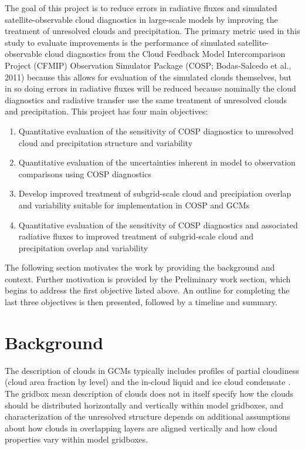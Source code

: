 \documentclass[letter]{article}
\begin{document}
The goal of this project is to reduce errors in radiative fluxes and simulated satellite-observable cloud diagnostics in large-scale models by improving the treatment of unresolved clouds and precipitation. The primary metric used in this study to evaluate improvements is the performance of simulated satellite-observable cloud diagnostics from the Cloud Feedback Model Intercomparison Project (CFMIP) Observation Simulator Package (COSP; Bodas-Salcedo et al., 2011) because this allows for evaluation of the simulated clouds themselves, but in so doing errors in radiative fluxes will be reduced because nominally the cloud diagnostics and radiative transfer use the same treatment of unresolved clouds and precipitation. 
This project has four main objectives:
\begin{enumerate}
    \item Quantitative evaluation of the sensitivity of COSP diagnostics to unresolved cloud and precipitation structure and variability
    \item Quantitative evaluation of the uncertainties inherent in model to observation comparisons using COSP diagnostics
    \item Develop improved treatment of subgrid-scale cloud and precipiation overlap and variability suitable for implementation in COSP and GCMs
    \item Quantitative evaluation of the sensitivity of COSP diagnostics and associated radiative fluxes to improved treatment of subgrid-scale cloud and precipitation overlap and variability
\end{enumerate}

The following section motivates the work by providing the background and context. Further motivation is provided by the Preliminary work section, which begins to address the first objective listed above. An outline for completing the last three objectives is then presented, followed by a timeline and summary.

\section{Background}
The description of clouds in GCMs typically includes profiles of partial cloudiness (cloud area fraction by level) and the in-cloud liquid and ice cloud condensate \citep[e.g.,][]{cam3_description,cam4_description}. The gridbox mean description of clouds does not in itself specify how the clouds should be distributed horizontally and vertically within model gridboxes, and characterization of the unresolved structure depends on additional assumptions about how clouds in overlapping layers are aligned vertically and how cloud properties vary within model gridboxes.
\end{document}
